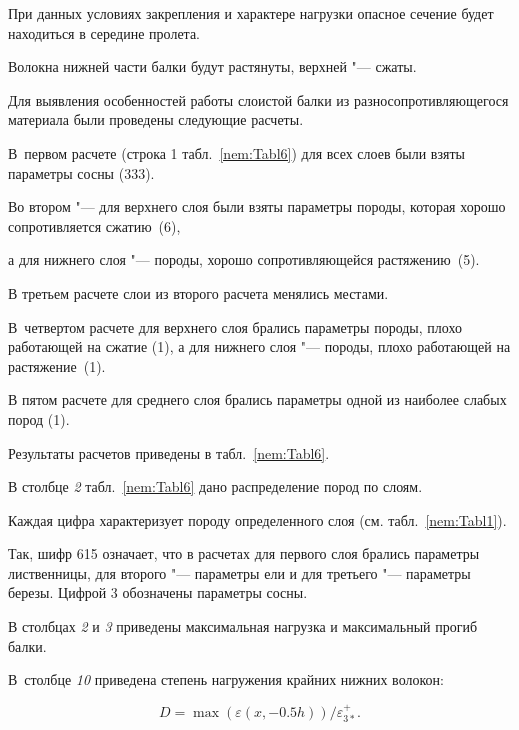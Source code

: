 




При данных условиях закрепления и характере нагрузки опасное сечение будет находиться в середине пролета. 

Волокна нижней части балки будут растянуты, верхней "---  сжаты.









Для выявления особенностей работы слоистой балки из разносопротивляющегося материала были проведены следующие расчеты. 

В~первом расчете (строка 1 табл.~\ref{nem:Tabl6}) для всех слоев были взяты параметры сосны (333). 

Во втором "---  для верхнего слоя были взяты параметры породы, которая хорошо сопротивляется сжатию~(6), 

а для нижнего слоя "--- породы, хорошо сопротивляющейся растяжению~(5). 

В третьем расчете слои из второго расчета менялись местами. 

В~четвертом расчете для верхнего слоя брались параметры породы, плохо работающей на сжатие (1), а для нижнего слоя "---  породы, плохо работающей на растяжение~(1). 

В пятом расчете для среднего слоя брались параметры одной из наиболее слабых пород (1). 

Результаты расчетов приведены в табл.~\ref{nem:Tabl6}.



В столбце {\sl 2} табл.~\ref{nem:Tabl6} дано распределение пород по слоям. 

Каждая цифра характеризует породу определенного слоя (см. табл.~\ref{nem:Tabl1}). 

Так, шифр 615 означает, что в расчетах для первого слоя брались параметры лиственницы, для второго "---  параметры ели и для третьего "---  параметры березы.  Цифрой 3 обозначены параметры сосны. 





В столбцах {\sl 2} и {\sl 3} приведены максимальная нагрузка и максимальный прогиб балки. 

В~столбце {\sl 10} приведена степень нагружения крайних нижних волокон:

\begin{equation}

\label{Degree}

D = \max\left(\varepsilon\left(x,-0.5h\right)\right)/\varepsilon_{3*}^+.

\end{equation}





